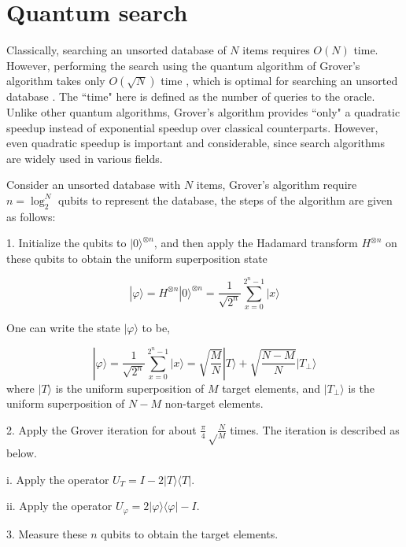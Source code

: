\documentclass[aps,pra,twocolumn,superscriptaddress]{revtex4-1}
\begin{document}
\maketitle

\section{Quantum search}

Classically, searching an unsorted database of $N$ items requires $O(N)$ time. However, performing the search using the quantum algorithm of Grover's algorithm takes only $O(\sqrt{N})$ time \cite{grover1997quantum}, which is optimal for searching an unsorted database \cite{bennett1997strengths, zalka1999grover}. The ``time" here is defined as the number of queries to the oracle. Unlike other quantum algorithms, Grover's algorithm provides ``only" a quadratic speedup instead of exponential speedup over classical counterparts. However, even quadratic speedup is important and considerable, since search algorithms are widely used in various fields.

Consider an unsorted database with $N$ items, Grover's algorithm require $n=\log_2^N$ qubits to represent the database, the steps of the algorithm are given as follows:

1. Initialize the qubits to $|0{\rangle ^{ \otimes n}}$, and then apply the Hadamard transform ${H^{ \otimes n}}$ on these qubits to obtain the uniform superposition state

\[|\varphi \rangle  = {H^{ \otimes n}}|0{\rangle ^{ \otimes n}} = \frac{1}{{\sqrt {{2^n}} }}\sum\limits_{x = 0}^{{2^n} - 1} {|x\rangle } \]

One can write the state $|\varphi \rangle$ to be,

\[|\varphi \rangle  = \frac{1}{{\sqrt {{2^n}} }}\sum\limits_{x = 0}^{{2^n} - 1} {|x\rangle }  = \sqrt {\frac{M}{N}} |T\rangle  + \sqrt {\frac{{N - M}}{N}} |{T_ \bot }\rangle \]
where $|T\rangle$ is the uniform superposition of $M$ target elements, and $|{T_ \bot }\rangle$ is the uniform superposition of $N-M$ non-target elements.

2. Apply the Grover iteration for about $\frac{\pi }{4}\sqrt \frac{N}{M}$ times. The iteration is described as below.

i. Apply the operator ${U_T} = I - 2|T\rangle \langle T|$.

ii. Apply the operator ${U_\varphi } = 2|\varphi \rangle \langle \varphi | - I$.

3. Measure these $n$ qubits to obtain the target elements.
\end{document}
